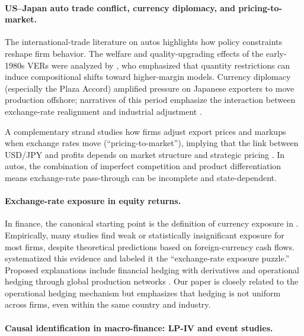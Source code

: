 \documentclass[12pt,a4paper]{article}
\begin{document}
\paragraph{US--Japan auto trade conflict, currency diplomacy, and pricing-to-market.}

The international-trade literature on autos highlights how policy constraints reshape firm behavior. The welfare and quality-upgrading effects of the early-1980s VERs were analyzed by \citet{feenstra1984}, who emphasized that quantity restrictions can induce compositional shifts toward higher-margin models. Currency diplomacy (especially the Plaza Accord) amplified pressure on Japanese exporters to move production offshore; narratives of this period emphasize the interaction between exchange-rate realignment and industrial adjustment \citep{funabashi1988}.

A complementary strand studies how firms adjust export prices and markups when exchange rates move (``pricing-to-market''), implying that the link between USD/JPY and profits depends on market structure and strategic pricing \citep{krugman1987,knetter1993,goldbergknetter1997}. In autos, the combination of imperfect competition and product differentiation means exchange-rate pass-through can be incomplete and state-dependent.

\paragraph{Exchange-rate exposure in equity returns.}

In finance, the canonical starting point is the definition of currency exposure in \citet{adler1984}. Empirically, many studies find weak or statistically insignificant exposure for most firms, despite theoretical predictions based on foreign-currency cash flows. \citet{bartram2010} systematized this evidence and labeled it the ``exchange-rate exposure puzzle.'' Proposed explanations include financial hedging with derivatives \citep{bodnar2002,allayannis2001} and operational hedging through global production networks \citep{pantzalis2001}. Our paper is closely related to the operational hedging mechanism but emphasizes that hedging is not uniform across firms, even within the same country and industry.

\paragraph{Causal identification in macro-finance: LP-IV and event studies.}
\end{document}
